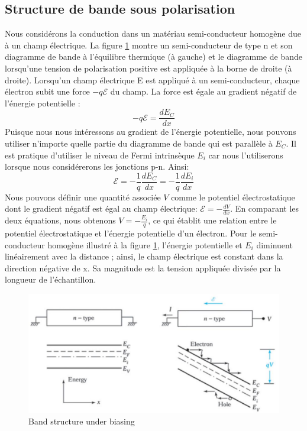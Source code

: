 \subsection{Structure de bande sous polarisation}
Nous considérons la conduction dans un matériau semi-conducteur homogène due à un champ électrique. La figure \ref{fig:bandbiasing} montre un semi-conducteur de type n et son diagramme de bande à l'équilibre thermique (à gauche) et le diagramme de bande lorsqu'une tension de polarisation positive est appliquée à la borne de droite (à droite). Lorsqu'un champ électrique E est appliqué à un semi-conducteur, chaque électron subit une force $-q \mathcal{E}$ du champ. La force est égale au gradient négatif de l'énergie potentielle :
$$
-q \mathcal{E} = \frac{dE_C}{dx}
$$
Puisque nous nous intéressons au gradient de l'énergie potentielle, nous pouvons utiliser n'importe quelle partie du diagramme de bande qui est parallèle à $E_C$. Il est pratique d'utiliser le niveau de Fermi intrinsèque $E_{i}$ car nous l'utiliserons lorsque nous considérerons les jonctions p-n. Ainsi:
$$
\mathcal{E} = -\frac{1}{q}\frac{dE_C}{dx} = -\frac{1}{q}\frac{dE_i}{dx} 
$$
Nous pouvons définir une quantité associée $V$ comme le potentiel électrostatique dont le gradient négatif est égal au champ électrique: $\mathcal{E} = - \frac{d V}{dx}$. En comparant les deux équations, nous obtenons $V = -\frac{E_i}{q}$, ce qui établit une relation entre le potentiel électrostatique et l'énergie potentielle d'un électron. Pour le semi-conducteur homogène illustré à la figure \ref{fig:bandbiasing}, l'énergie potentielle et $E_i$ diminuent linéairement avec la distance ; ainsi, le champ électrique est constant dans la direction négative de x. Sa magnitude est la tension appliquée divisée par la longueur de l'échantillon.\\
\begin{figure}[h!]
\centering
\includegraphics[width=12cm]{figures/ch01/bandbiasing.jpg}
\caption{Band structure under biasing} 
\label{fig:bandbiasing}
\end{figure}
